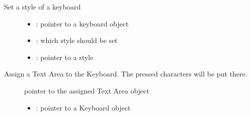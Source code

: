 \documentclass[letterpaper,10pt,english]{sphinxmanual}
\begin{document}

\begin{fulllineitems}
\label{\detokenize{object-types/kb:_CPPv415lv_kb_set_styleP8lv_obj_t13lv_kb_style_tPK10lv_style_t}}%
\pysigstartmultiline
{}\label{\detokenize{object-types/kb:lv__kb_8h_1a04b929b693f5a61e1e642f88c98ddf49}}%
\pysigstopmultiline
Set a style of a keyboard \begin{description}
\item[{}] \leavevmode\begin{itemize}
\item {} 
: pointer to a keyboard object 

\item {} 
: which style should be set 

\item {} 
: pointer to a style 

\end{itemize}

\end{description}


\end{fulllineitems}


\begin{fulllineitems}
\label{\detokenize{object-types/kb:_CPPv412lv_kb_get_taPK8lv_obj_t}}%
\pysigstartmultiline
{}\label{\detokenize{object-types/kb:lv__kb_8h_1a21b8aa8c5c54b03cf0713368ccbeaba7}}%
\pysigstopmultiline
Assign a Text Area to the Keyboard. The pressed characters will be put there. \begin{description}
\item[{}] \leavevmode
pointer to the assigned Text Area object 

\item[{}] \leavevmode\begin{itemize}
\item {} 
: pointer to a Keyboard object 

\end{itemize}

\end{description}


\end{fulllineitems}
\end{document}
